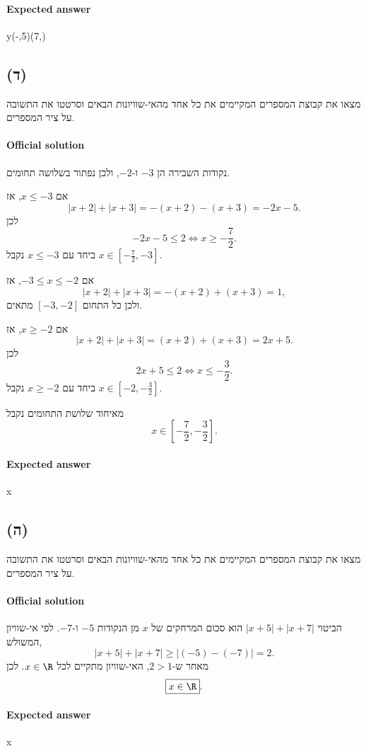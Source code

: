 \documentclass[12pt]{article}
\begin{document}
\paragraph{Expected answer}
y\in(-\infty,5)\cup(7,\infty)


\subsection*{(ד)}
מצאו את קבוצת המספרים המקיימים את כל אחד מהאי-שוויונות הבאים וסרטטו את התשובה על ציר המספרים.

\paragraph{Official solution}
נקודות השבירה הן \(-3\) ו-\(-2\), ולכן נפתור בשלושה תחומים.

אם \(x\le -3\), אז
\[
|x+2|+|x+3|=-(x+2)-(x+3)=-2x-5.
\]
לכן
\[
-2x-5\le 2 \iff x\ge -\frac{7}{2}.
\]
ביחד עם \(x\le -3\) נקבל \(x\in[-\frac72,-3]\).

אם \(-3\le x\le -2\), אז
\[
|x+2|+|x+3|=-(x+2)+(x+3)=1,
\]
ולכן כל התחום \([-3,-2]\) מתאים.

אם \(x\ge -2\), אז
\[
|x+2|+|x+3|=(x+2)+(x+3)=2x+5.
\]
לכן
\[
2x+5\le 2 \iff x\le -\frac32.
\]
ביחד עם \(x\ge -2\) נקבל \(x\in[-2,-\frac32]\).

מאיחוד שלושת התחומים נקבל
\[
\boxed{x\in\left[-\frac72,-\frac32\right]}.
\]

\paragraph{Expected answer}
x\in{}


\subsection*{(ה)}
מצאו את קבוצת המספרים המקיימים את כל אחד מהאי-שוויונות הבאים וסרטטו את התשובה על ציר המספרים.

\paragraph{Official solution}
הביטוי \(|x+5|+|x+7|\) הוא סכום המרחקים של \(x\) מן הנקודות \(-5\) ו-\(-7\). לפי אי-שוויון המשולש,
\[
|x+5|+|x+7|\ge |(-5)-(-7)|=2.
\]
מאחר ש-\(2>1\), האי-שוויון מתקיים לכל \(x\in\R\). לכן
\[
\boxed{x\in\R}.
\]

\paragraph{Expected answer}
x\in\R
\end{document}
